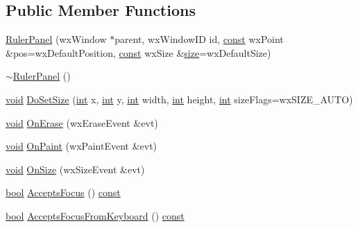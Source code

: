 \subsection*{Public Member Functions}
\begin{DoxyCompactItemize}
\item 
\hyperlink{class_ruler_panel_aa21179683647b186cfedcfbd71cc1e63}{Ruler\+Panel} (wx\+Window $\ast$parent, wx\+Window\+ID id, \hyperlink{getopt1_8c_a2c212835823e3c54a8ab6d95c652660e}{const} wx\+Point \&pos=wx\+Default\+Position, \hyperlink{getopt1_8c_a2c212835823e3c54a8ab6d95c652660e}{const} wx\+Size \&\hyperlink{group__lavu__mem_ga854352f53b148adc24983a58a1866d66}{size}=wx\+Default\+Size)
\item 
\hyperlink{class_ruler_panel_ae5b5f3ea81ba0e0ddd728e834dc4f61b}{$\sim$\+Ruler\+Panel} ()
\item 
\hyperlink{sound_8c_ae35f5844602719cf66324f4de2a658b3}{void} \hyperlink{class_ruler_panel_a12595c740c88e920eab2f96714e61f60}{Do\+Set\+Size} (\hyperlink{xmltok_8h_a5a0d4a5641ce434f1d23533f2b2e6653}{int} x, \hyperlink{xmltok_8h_a5a0d4a5641ce434f1d23533f2b2e6653}{int} y, \hyperlink{xmltok_8h_a5a0d4a5641ce434f1d23533f2b2e6653}{int} width, \hyperlink{xmltok_8h_a5a0d4a5641ce434f1d23533f2b2e6653}{int} height, \hyperlink{xmltok_8h_a5a0d4a5641ce434f1d23533f2b2e6653}{int} size\+Flags=wx\+S\+I\+Z\+E\+\_\+\+A\+U\+TO)
\item 
\hyperlink{sound_8c_ae35f5844602719cf66324f4de2a658b3}{void} \hyperlink{class_ruler_panel_aecb13de8900f1797a256668947cbc46f}{On\+Erase} (wx\+Erase\+Event \&evt)
\item 
\hyperlink{sound_8c_ae35f5844602719cf66324f4de2a658b3}{void} \hyperlink{class_ruler_panel_adbcb18cb832daaf8d3efb6c515b97adc}{On\+Paint} (wx\+Paint\+Event \&evt)
\item 
\hyperlink{sound_8c_ae35f5844602719cf66324f4de2a658b3}{void} \hyperlink{class_ruler_panel_a3d8be00d81d09c5752a075884073f805}{On\+Size} (wx\+Size\+Event \&evt)
\item 
\hyperlink{mac_2config_2i386_2lib-src_2libsoxr_2soxr-config_8h_abb452686968e48b67397da5f97445f5b}{bool} \hyperlink{class_ruler_panel_a200be08e623e99250ae15dffa2e2b7e2}{Accepts\+Focus} () \hyperlink{getopt1_8c_a2c212835823e3c54a8ab6d95c652660e}{const} 
\item 
\hyperlink{mac_2config_2i386_2lib-src_2libsoxr_2soxr-config_8h_abb452686968e48b67397da5f97445f5b}{bool} \hyperlink{class_ruler_panel_a5bd255cc16c78ead0d4a5552d69d9031}{Accepts\+Focus\+From\+Keyboard} () \hyperlink{getopt1_8c_a2c212835823e3c54a8ab6d95c652660e}{const} 
\end{DoxyCompactItemize}
